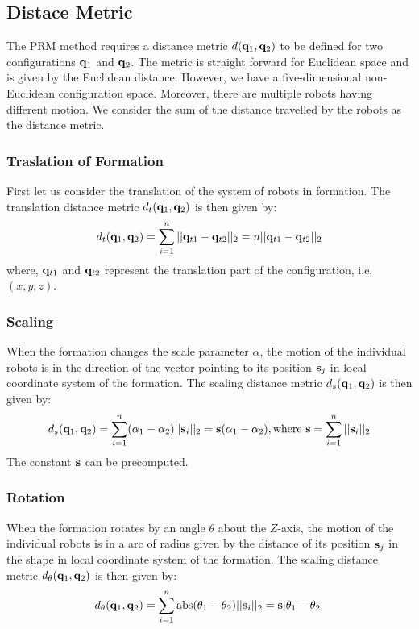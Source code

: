 \documentclass[12pt,a4paper, onecolumn]{IEEEtran}
\begin{document}
\subsection{Distace Metric}
The PRM method requires a distance metric $d(\mathbf{q}_1, \mathbf{q}_2)$ to be defined for two configurations $\mathbf{q}_1$ and $\mathbf{q}_2$. The metric is straight forward for Euclidean space and is given by the Euclidean distance. However, we have a five-dimensional non-Euclidean configuration space. Moreover, there are multiple robots having different motion. We consider the sum of the distance travelled by the robots as the distance metric.
\subsubsection{Traslation of Formation}
First let us consider the translation of the system of robots in formation. The translation distance metric $d_t(\mathbf{q}_1, \mathbf{q}_2)$ is then given by:
\begin{equation}
d_t(\mathbf{q}_1, \mathbf{q}_2) = \sum_{i = 1}^{n} ||\mathbf{q}_{t1} - \mathbf{q}_{t2}||_2 = n||\mathbf{q}_{t1} - \mathbf{q}_{t2}||_2
  \label{eqn:dt}
\end{equation}
where, $\mathbf{q}_{t1}$ and $\mathbf{q}_{t2}$ represent the translation part of the configuration, i.e, $(x, y, z)$.

\subsubsection{Scaling}
When the formation changes the scale parameter $\alpha$, the motion of the individual robots is in the direction of the vector pointing to its position $\mathbf{s}_j$ in local coordinate system of the formation. The scaling distance metric $d_s(\mathbf{q}_1, \mathbf{q}_2)$ is then given by:
\begin{equation}
  d_s(\mathbf{q}_1, \mathbf{q}_2) = \sum_{i=1}^n (\alpha_1 - \alpha_2) ||\mathbf{s}_i||_2 = \mathbf{s} (\alpha_1 - \alpha_2), \text {where } \mathbf{s} = \sum_{i=1}^n ||\mathbf{s}_i||_2
  \label{eqn:ds}
\end{equation}
The constant $\mathbf{s}$ can be precomputed.

\subsubsection{Rotation}
When the formation rotates by an angle $\theta$ about the $Z$-axis, the motion of the individual robots is in a arc of radius given by the distance of its position $\mathbf{s}_j$  in the shape in local coordinate system of the formation. The scaling distance metric $d_\theta(\mathbf{q}_1, \mathbf{q}_2)$ is then given by:
\begin{equation}
  d_\theta(\mathbf{q}_1, \mathbf{q}_2) = \sum_{i=1}^n \operatorname{abs}(\theta_1 - \theta_2) ||\mathbf{s}_i||_2 = \mathbf{s} |\theta_1 - \theta_2| 
  \label{eqn:dth}
\end{equation}
\end{document}
